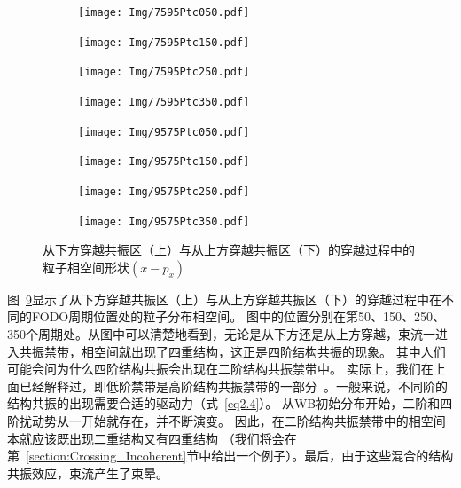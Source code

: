 \begin{figure}
    \centering
    \begin{subfigure}[b]{0.24\textwidth}
        \texttt{[image: Img/7595Ptc050.pdf]}
        \caption{}
        \label{sfig:75_95_ptc1}
    \end{subfigure}
    \begin{subfigure}[b]{0.24\textwidth}
        \texttt{[image: Img/7595Ptc150.pdf]}
        \caption{}
        \label{sfig:75_95_ptc2}
    \end{subfigure}
    \begin{subfigure}[b]{0.24\textwidth}
        \texttt{[image: Img/7595Ptc250.pdf]}
        \caption{}
        \label{sfig:75_95_ptc3}
    \end{subfigure}
    \begin{subfigure}[b]{0.24\textwidth}
        \texttt{[image: Img/7595Ptc350.pdf]}
        \caption{}
        \label{sfig:75_95_ptc4}
    \end{subfigure}

    \begin{subfigure}[b]{0.24\textwidth}
        \texttt{[image: Img/9575Ptc050.pdf]}
        \caption{}
        \label{sfig:95_75_ptc1}
    \end{subfigure}
    \begin{subfigure}[b]{0.24\textwidth}
        \texttt{[image: Img/9575Ptc150.pdf]}
        \caption{}
        \label{sfig:95_75_ptc2}
    \end{subfigure}
    \begin{subfigure}[b]{0.24\textwidth}
        \texttt{[image: Img/9575Ptc250.pdf]}
        \caption{}
        \label{sfig:95_75_ptc3}
    \end{subfigure}
    \begin{subfigure}[b]{0.24\textwidth}
        \texttt{[image: Img/9575Ptc350.pdf]}
        \caption{}
        \label{sfig:95_75_ptc4}
    \end{subfigure}
    \caption{从下方穿越共振区（上）与从上方穿越共振区（下）的穿越过程中的粒子相空间形状$(x-p_x)$}
    \label{fig:95_75_ptc}
\end{figure}

图~\ref{fig:95_75_ptc}显示了从下方穿越共振区（上）与从上方穿越共振区（下）的穿越过程中在不同的FODO周期位置处的粒子分布相空间。
图中的位置分别在第50、150、250、350个周期处。从图中可以清楚地看到，无论是从下方还是从上方穿越，束流一进入共振禁带，相空间就出现了四重结构，这正是四阶结构共振的现象。
其中人们可能会问为什么四阶结构共振会出现在二阶结构共振禁带中。 实际上，我们在上面已经解释过，即低阶禁带是高阶结构共振禁带的一部分~\cite{11, 12}。一般来说，不同阶的结构共振的出现需要合适的驱动力（式~\ref{eq2.4}）。
从WB初始分布开始，二阶和四阶扰动势从一开始就存在，并不断演变。
因此，在二阶结构共振禁带中的相空间本就应该既出现二重结构又有四重结构 （我们将会在第~\ref{section:Crossing_Incoherent}节中给出一个例子）。最后，由于这些混合的结构共振效应，束流产生了束晕。


